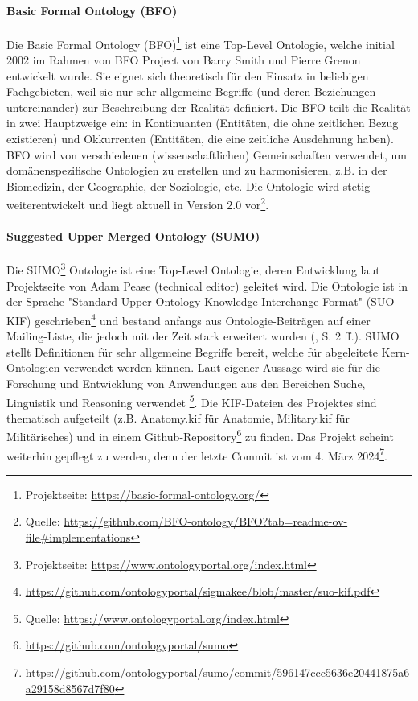\documentclass{article}
\begin{document}
\paragraph{Basic Formal Ontology (BFO)} Die Basic Formal Ontology (BFO)\footnote{Projektseite: \url{https://basic-formal-ontology.org/}} ist eine Top-Level Ontologie, welche initial 2002 im Rahmen von BFO Project von Barry Smith und Pierre Grenon entwickelt wurde.
Sie eignet sich theoretisch für den Einsatz in beliebigen Fachgebieten, weil sie nur sehr allgemeine Begriffe (und deren Beziehungen untereinander) zur Beschreibung der Realität definiert.
Die BFO teilt die Realität in zwei Hauptzweige ein: in Kontinuanten (Entitäten, die ohne zeitlichen Bezug existieren) und Okkurrenten (Entitäten, die eine zeitliche Ausdehnung haben).
BFO wird von verschiedenen (wissenschaftlichen) Gemeinschaften verwendet, um domänenspezifische Ontologien zu erstellen und zu harmonisieren, z.B. in der Biomedizin, der Geographie, der Soziologie, etc.
Die Ontologie wird stetig weiterentwickelt und liegt aktuell in Version 2.0 vor\footnote{Quelle: \url{https://github.com/BFO-ontology/BFO?tab=readme-ov-file\#implementations}}.

\paragraph{Suggested Upper Merged Ontology (SUMO)}

Die SUMO\footnote{Projektseite: \url{https://www.ontologyportal.org/index.html}} Ontologie ist eine Top-Level Ontologie, deren Entwicklung laut Projektseite von Adam Pease (technical editor) geleitet wird.
Die Ontologie ist in der Sprache "Standard Upper Ontology Knowledge Interchange Format" (SUO-KIF) geschrieben\footnote{\url{https://github.com/ontologyportal/sigmakee/blob/master/suo-kif.pdf}} und bestand anfangs aus Ontologie-Beiträgen auf einer Mailing-Liste, die jedoch mit der Zeit stark erweitert wurden (\cite{niles2001towards}, S. 2 ff.).
SUMO stellt Definitionen für sehr allgemeine Begriffe bereit, welche für abgeleitete Kern-Ontologien verwendet werden können.
Laut eigener Aussage wird sie für die Forschung und Entwicklung von Anwendungen aus den Bereichen Suche, Linguistik und Reasoning verwendet \footnote{Quelle: \url{https://www.ontologyportal.org/index.html}}.
Die KIF-Dateien des Projektes sind thematisch aufgeteilt (z.B. Anatomy.kif für Anatomie, Military.kif für Militärisches) und in einem Github-Repository\footnote{\url{https://github.com/ontologyportal/sumo}} zu finden.
Das Projekt scheint weiterhin gepflegt zu werden, denn der letzte Commit ist vom 4. März 2024\footnote{\url{https://github.com/ontologyportal/sumo/commit/596147ccc5636e20441875a6a29158d8567d7f80}}.
\end{document}
